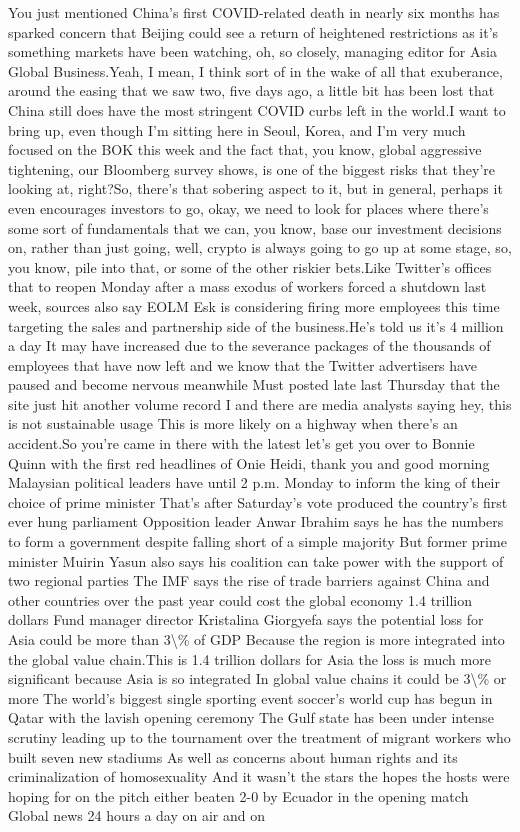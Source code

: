 \documentclass{article}%
\begin{document}
You just mentioned China's first COVID{-}related death in nearly six months has sparked concern that Beijing could see a return of heightened restrictions as it's something markets have been watching, oh, so closely, managing editor for Asia Global Business.Yeah, I mean, I think sort of in the wake of all that exuberance, around the easing that we saw two, five days ago, a little bit has been lost that China still does have the most stringent COVID curbs left in the world.I want to bring up, even though I'm sitting here in Seoul, Korea, and I'm very much focused on the BOK this week and the fact that, you know, global aggressive tightening, our Bloomberg survey shows, is one of the biggest risks that they're looking at, right?So, there's that sobering aspect to it, but in general, perhaps it even encourages investors to go, okay, we need to look for places where there's some sort of fundamentals that we can, you know, base our investment decisions on, rather than just going, well, crypto is always going to go up at some stage, so, you know, pile into that, or some of the other riskier bets.Like Twitter's offices that to reopen Monday after a mass exodus of workers forced a shutdown last week, sources also say EOLM Esk is considering firing more employees this time targeting the sales and partnership side of the business.He's told us it's 4 million a day It may have increased due to the severance packages of the thousands of employees that have now left and we know that the Twitter advertisers have paused and become nervous meanwhile Must posted late last Thursday that the site just hit another volume record I and there are media analysts saying hey, this is not sustainable usage This is more likely on a highway when there's an accident.So you're came in there with the latest let's get you over to Bonnie Quinn with the first red headlines of Onie Heidi, thank you and good morning Malaysian political leaders have until 2 p.m. Monday to inform the king of their choice of prime minister That's after Saturday's vote produced the country's first ever hung parliament Opposition leader Anwar Ibrahim says he has the numbers to form a government despite falling short of a simple majority But former prime minister Muirin Yasun also says his coalition can take power with the support of two regional parties The IMF says the rise of trade barriers against China and other countries over the past year could cost the global economy 1.4 trillion dollars Fund manager director Kristalina Giorgyefa says the potential loss for Asia could be more than 3\textbackslash{}\% of GDP Because the region is more integrated into the global value chain.This is 1.4 trillion dollars for Asia the loss is much more significant because Asia is so integrated In global value chains it could be 3\textbackslash{}\% or more The world's biggest single sporting event soccer's world cup has begun in Qatar with the lavish opening ceremony The Gulf state has been under intense scrutiny leading up to the tournament over the treatment of migrant workers who built seven new stadiums As well as concerns about human rights and its criminalization of homosexuality And it wasn't the stars the hopes the hosts were hoping for on the pitch either beaten 2{-}0 by Ecuador in the opening match Global news 24 hours a day on air and on 
\end{document}
